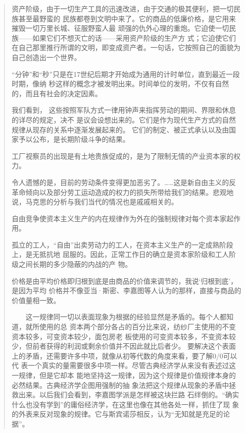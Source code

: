 \begin{quotation}
资产阶级，由于一切生产工具的迅速改进，由于交通的极其便利，把一切民族甚至最野蛮的
民族都卷到文明中来了。它的商品的低廉价格，是它用来摧毁一切万里长城、征服野蛮人最
顽强的仇外心理的重炮。它迫使一切民族——如果它们不想灭亡的话——采用资产阶级的生产方
式；它迫使它们在自己那里推行所谓的文明，即变成资产者。一句话，它按照自己的面貌为
自己创造出一个世界。 


“分钟”和“秒”只是在17世纪后期才开始成为通用的计时单位，直到最近一段时期，像纳
秒这样的概念才被发明出来。时间单位的发明，不仅有自然的，而且有社会的决定因素。 

我们看到， 这些按照军队方式一律用钟声来指挥劳动的期间、界限和休息的详尽的规定，决不
是议会设想出来的。它们是作为现代生产方式的自然规律从现存的关系中逐渐发展起来的。
它们的制定、被正式承认以及由国家予以公布，是长期阶级斗争的结果。 

工厂视察员的出现是有土地贵族促成的，是为了限制无情的产业资本家的权力。

令人遗憾的是，目前的劳动条件变得更加恶劣了。……这是新自由主义的反革命倾向以及部分劳工运动造成的权力的损失所带给我们的结果。悲观地说，马克思的分析与我们当代的情况也是戚戚相关的。

自由竞争使资本主义生产的内在规律作为外在的强制规律对每个资本家起作
用。


孤立的工人，“自由”出卖劳动力的工人，在资本主义生产的一定成熟阶段上，是无抵抗地
屈服的。因此，正常工作日的确立是资本家阶级和工人阶级之间长期的多少隐蔽的内战的产
物。

  价格是由平均价格即归根到底是由商品的价值来调节的，我说‘归根到底’，是因为平均
价格并不像亚当·斯密、李嘉图等人认为的那样，直接与商品的价值量相一致。

　　这一规律同一切以表面现象为根据的经验显然是矛盾的。每个人都知道，就所使用的总
资本两个部分各占的百分比来说，纺纱厂主使用的不变资本较多，可变资本较少，面包房老
板使用的可变资本较多，不变资本较少，但前者获得的利润或剩余价值并不因此就比后者少。
要解决这个表面上的矛盾，还需要许多中项，就像从初等代数的角度来看，要了解0/0可以代
表一个真实的量需要很多中项一样。尽管古典经济学从来没有表述过这一规律，但是它却本
能地坚持这一规律，因为这个规律是价值规律本身的必然结果。古典经济学企图用强制的抽
象法把这个规律从现象的矛盾中拯救出来。以后我们会看到，李嘉图学派是怎样被这块拦路
石绊倒的。“确实什么也没有学到”的庸俗经济学，在这里也像在其他各处一样，抓住了现
象的外表来反对现象的规律。它与斯宾诺莎相反，认为“无知就是充足的论
据”。


\end{quotation}

